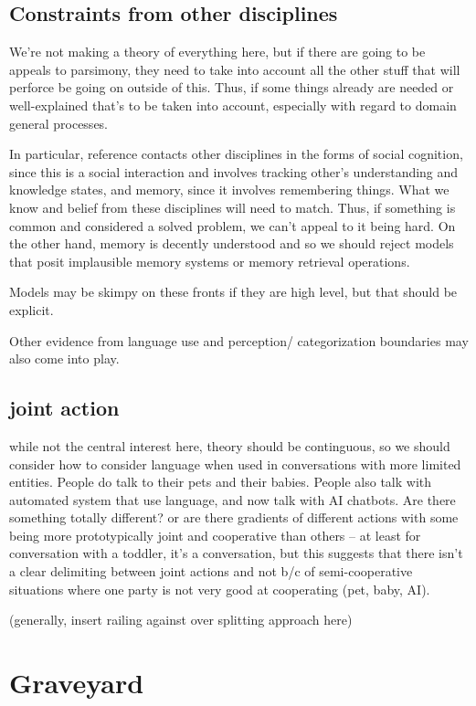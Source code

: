 \documentclass[]{article}
\begin{document}
\subsection{Constraints from other disciplines}
We're not making a theory of everything here, but if there are going to be appeals to parsimony, they need to take into account all the other stuff that will perforce be going on outside of this. Thus, if some things already are needed or well-explained that's to be  taken into account, especially with regard to domain general processes. 

In particular, reference contacts other disciplines in the forms of social cognition, since this is a social interaction and involves tracking other's understanding and knowledge states, and memory, since it involves remembering things. What we know and belief from these disciplines will need to match. Thus, if something is common and considered a solved problem, we can't appeal to it being hard. On the other hand, memory is decently understood and so we should reject models that posit implausible memory systems or memory retrieval operations. 

Models may be skimpy on these fronts if they are high level, but that should be explicit. 

Other evidence from language use and perception/ categorization boundaries may also come into play. 

\subsection{joint action}
\cite{clark1996} while not the central interest here, theory should be continguous, so we should consider how to consider language when used in conversations with more limited entities. People do talk to their pets and their babies. People also talk with automated system that use language, and now talk with AI chatbots. Are there something totally different? or are there gradients of different actions with some being more prototypically joint and cooperative than others -- at least for conversation with a toddler, it's a conversation, but this suggests that there isn't a clear delimiting between joint actions and not b/c of semi-cooperative situations where one party is not very good at cooperating (pet, baby, AI). 

(generally, insert railing against over splitting approach here)

\section{Graveyard}
\end{document}
